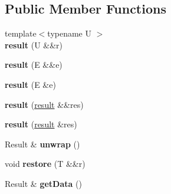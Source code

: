 \subsection*{Public Member Functions}
\begin{DoxyCompactItemize}
\item 
{\footnotesize template$<$typename U $>$ }\\{\bfseries result} (U \&\&r)\hypertarget{classgxx_1_1result__type_1_1result_af10e161de99bd1cbcd0274b270815cd5}{}\label{classgxx_1_1result__type_1_1result_af10e161de99bd1cbcd0274b270815cd5}

\item 
{\bfseries result} (E \&\&e)\hypertarget{classgxx_1_1result__type_1_1result_a10ba2d676a289a6e27ae8416f325a8a0}{}\label{classgxx_1_1result__type_1_1result_a10ba2d676a289a6e27ae8416f325a8a0}

\item 
{\bfseries result} (E \&e)\hypertarget{classgxx_1_1result__type_1_1result_a348b1fc543ceeddc63f1a106147160a2}{}\label{classgxx_1_1result__type_1_1result_a348b1fc543ceeddc63f1a106147160a2}

\item 
{\bfseries result} (\hyperlink{classgxx_1_1result__type_1_1result}{result} \&\&res)\hypertarget{classgxx_1_1result__type_1_1result_a7f4d1d855d7be48828734e263bccb66b}{}\label{classgxx_1_1result__type_1_1result_a7f4d1d855d7be48828734e263bccb66b}

\item 
{\bfseries result} (\hyperlink{classgxx_1_1result__type_1_1result}{result} \&res)\hypertarget{classgxx_1_1result__type_1_1result_a57f37b48593f57c7d7ad64d10952599c}{}\label{classgxx_1_1result__type_1_1result_a57f37b48593f57c7d7ad64d10952599c}

\item 
Result \& {\bfseries unwrap} ()\hypertarget{classgxx_1_1result__type_1_1result_a0071bfc412e0ecc5cc573f28ce54e39a}{}\label{classgxx_1_1result__type_1_1result_a0071bfc412e0ecc5cc573f28ce54e39a}

\item 
void {\bfseries restore} (T \&\&r)\hypertarget{classgxx_1_1result__type_1_1result_a28ac3af0d621bd5feb8f1dd9f681f18e}{}\label{classgxx_1_1result__type_1_1result_a28ac3af0d621bd5feb8f1dd9f681f18e}

\item 
Result \& {\bfseries get\+Data} ()\hypertarget{classgxx_1_1result__type_1_1result_a30c0e5b1bc95a0d6cf9b7c4434d2aa6b}{}\label{classgxx_1_1result__type_1_1result_a30c0e5b1bc95a0d6cf9b7c4434d2aa6b}


\end{DoxyCompactItemize}
